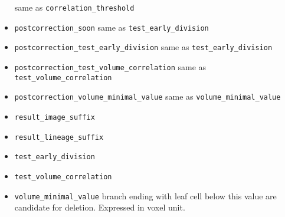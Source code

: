\begin{itemize}
      same as \texttt{correlation\_threshold}
\item \texttt{postcorrection\_soon}
      same as \texttt{test\_early\_division}
\item \texttt{postcorrection\_test\_early\_division}
      same as \texttt{test\_early\_division}
\item \texttt{postcorrection\_test\_volume\_correlation}
     same as \texttt{test\_volume\_correlation}
\item \texttt{postcorrection\_volume\_minimal\_value}
      same as \texttt{volume\_minimal\_value}
\item \texttt{result\_image\_suffix}
\item \texttt{result\_lineage\_suffix}
\item \texttt{test\_early\_division}
\item \texttt{test\_volume\_correlation}
\item \texttt{volume\_minimal\_value}
      branch ending with leaf cell below this value are candidate for deletion. Expressed in voxel unit.
\end{itemize}
